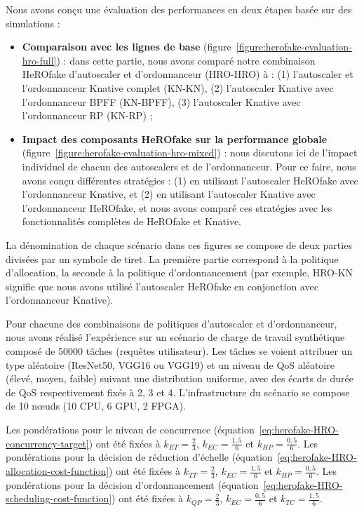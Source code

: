 Nous avons conçu une évaluation des performances en deux étapes basée sur des simulations :

\begin{itemize}
    \item \textbf{Comparaison avec les lignes de base} (figure~\ref{figure:herofake-evaluation-hro-full}) : dans cette partie, nous avons comparé notre combinaison HeROfake d'autoscaler et d'ordonnanceur (HRO-HRO) à : (1) l'autoscaler et l'ordonnanceur Knative complet (KN-KN), (2) l'autoscaler Knative avec l'ordonnanceur BPFF (KN-BPFF), (3) l'autoscaler Knative avec l'ordonnanceur RP (KN-RP) ; 
    \item \textbf{Impact des composants HeROfake sur la performance globale} (figure~\ref{figure:herofake-evaluation-hro-mixed}) : nous discutons ici de l'impact individuel de chacun des autoscalers et de l'ordonnanceur. Pour ce faire, nous avons conçu différentes stratégies : (1) en utilisant l'autoscaler HeROfake avec l'ordonnanceur Knative, et (2) en utilisant l'autoscaler Knative avec l'ordonnanceur HeROfake, et nous avons comparé ces stratégies avec les fonctionnalités complètes de HeROfake et Knative.
\end{itemize}

La dénomination de chaque scénario dans ces figures se compose de deux parties divisées par un symbole de tiret. La première partie correspond à la politique d'allocation, la seconde à la politique d'ordonnancement (par exemple, HRO-KN signifie que nous avons utilisé l'autoscaler HeROfake en conjonction avec l'ordonnanceur Knative). 

Pour chacune des combinaisons de politiques d'autoscaler et d'ordonnanceur, nous avons réalisé l'expérience sur un scénario de charge de travail synthétique composé de 50000 tâches (requêtes utilisateur). Les tâches se voient attribuer un type aléatoire (ResNet50, VGG16 ou VGG19) et un niveau de QoS aléatoire (élevé, moyen, faible) suivant une distribution uniforme, avec des écarts de durée de QoS respectivement fixés à 2, 3 et 4. L'infrastructure du scénario se compose de 10 nœuds (10 CPU, 6 GPU, 2 FPGA).

Les pondérations pour le niveau de concurrence (équation~\ref{eq:herofake-HRO-concurrency-target}) ont été fixées à $k_{ET} = \frac{2}{3}$, $k_{EC} = \frac{1,5}{6}$ et $k_{HP} = \frac{0,5}{6}$. Les pondérations pour la décision de réduction d'échelle (équation~\ref{eq:herofake-HRO-allocation-cost-function}) ont été fixées à $k_{TT} = \frac{2}{3}$, $k_{EC} = \frac{1,5}{6}$ et $k_{HP} = \frac{0,5}{6}$. Les pondérations pour la décision d'ordonnancement (équation~\ref{eq:herofake-HRO-scheduling-cost-function}) ont été fixées à $k_{QP} = \frac{2}{3}$, $k_{EC} = \frac{0,5}{6}$ et $k_{TC} = \frac{1,5}{6}$. 

